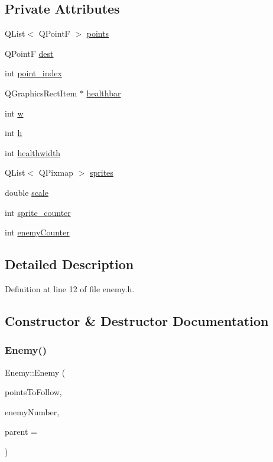 \subsection*{Private Attributes}
\begin{DoxyCompactItemize}
\item 
Q\+List$<$ Q\+PointF $>$ \hyperlink{class_enemy_ae8af9f207c5285b56f7cb190c66994c8}{points}
\item 
Q\+PointF \hyperlink{class_enemy_a50c844f66858b84fc8ebdfccf7e2c535}{dest}
\item 
int \hyperlink{class_enemy_a7291ad5563a976b78fbf6731b353f1c9}{point\+\_\+index}
\item 
Q\+Graphics\+Rect\+Item $\ast$ \hyperlink{class_enemy_ae2613608ff6c6d090a714874e722c340}{healthbar}
\item 
int \hyperlink{class_enemy_a259bfaab0f0d06c9ec2cb15c787e0b3a}{w}
\item 
int \hyperlink{class_enemy_adcb5512e63e735485cbb83f763acce75}{h}
\item 
int \hyperlink{class_enemy_aa5350ac40894832de19d669f0f65af4d}{healthwidth}
\item 
Q\+List$<$ Q\+Pixmap $>$ \hyperlink{class_enemy_ae65aa5ab482bb5eae5c0329c821e5827}{sprites}
\item 
double \hyperlink{class_enemy_a5c11ea6afd7998cf74a6a73dc05d0a63}{scale}
\item 
int \hyperlink{class_enemy_ad36955113c7ac1218b7435d7a87cb846}{sprite\+\_\+counter}
\item 
int \hyperlink{class_enemy_a5e1ff7cda54fcc5ae02925b0ecdbe1bc}{enemy\+Counter}
\end{DoxyCompactItemize}


\subsection{Detailed Description}


Definition at line 12 of file enemy.\+h.



\subsection{Constructor \& Destructor Documentation}
\mbox{\label{class_enemy_abfd2025e0660f920746f930d59b38bf0}} 
\subsubsection{\texorpdfstring{Enemy()}{Enemy()}}
{\footnotesize\ttfamily Enemy\+::\+Enemy (\begin{DoxyParamCaption}\item[{Q\+List$<$ Q\+PointF $>$}]{points\+To\+Follow,  }\item[{int}]{enemy\+Number,  }\item[{Q\+Graphics\+Item $\ast$}]{parent = {} }\end{DoxyParamCaption})}



